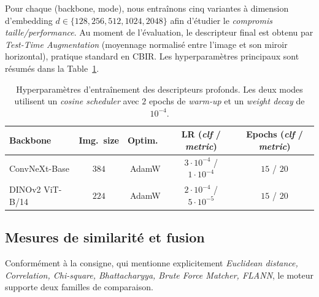 \documentclass[a4paper,11pt]{article}
\begin{document}
Pour chaque (backbone, mode), nous entraînons cinq variantes à dimension
d'embedding $d \in \{128, 256, 512, 1024, 2048\}$ afin d'étudier le
\emph{compromis taille/performance}. Au moment de l'évaluation, le
descripteur final est obtenu par \textit{Test-Time Augmentation}
(moyennage normalisé entre l'image et son miroir horizontal), pratique
standard en CBIR. Les hyperparamètres principaux sont résumés dans la
Table~\ref{tab:hyperparams_dl}.

\begin{table}[H]
\centering
\small
\begin{tabular}{lcccc}
\toprule
Backbone & Img.~size & Optim.~ & LR (\textit{clf} / \textit{metric}) & Epochs (\textit{clf} / \textit{metric}) \\
\midrule
ConvNeXt-Base    & $384$ & AdamW & $3{\cdot}10^{-4}$ / $1{\cdot}10^{-4}$ & $15$ / $20$ \\
DINOv2 ViT-B/14  & $224$ & AdamW & $2{\cdot}10^{-4}$ / $5{\cdot}10^{-5}$ & $15$ / $20$ \\
\bottomrule
\end{tabular}
\caption{Hyperparamètres d'entraînement des descripteurs profonds. Les
deux modes utilisent un \textit{cosine scheduler} avec $2$ epochs de
\textit{warm-up} et un \textit{weight decay} de $10^{-4}$.}
\label{tab:hyperparams_dl}
\end{table}

\subsection{Mesures de similarité et fusion}
\label{subsec:metrics}

Conformément à la consigne, qui mentionne explicitement \emph{Euclidean
distance, Correlation, Chi-square, Bhattacharyya, Brute Force Matcher,
FLANN}, le moteur supporte deux familles de comparaison.
\end{document}
